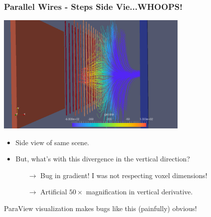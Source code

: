\documentclass[xcolor=dvipsnames]{beamer}
\begin{document}
\begin{frame}
  \frametitle{Parallel Wires - Steps Side Vie...WHOOPS!}
  \begin{center}
    \includegraphics[width=0.7\textwidth]{twodee-fine-drift-steps-side.png}    
  \end{center}
  \begin{itemize}\footnotesize
  \item Side view of same scene.
  \item But, what's with this divergence in the vertical direction?
    \begin{itemize}\scriptsize
    \item[$\rightarrow$] Bug in gradient! I was not respecting voxel dimensions!
    \item[$\rightarrow$] Artificial $50\times$ magnification in vertical derivative.
    \end{itemize}
  \end{itemize}
  ParaView visualization makes bugs like this (painfully) obvious!
\end{frame}
\end{document}
